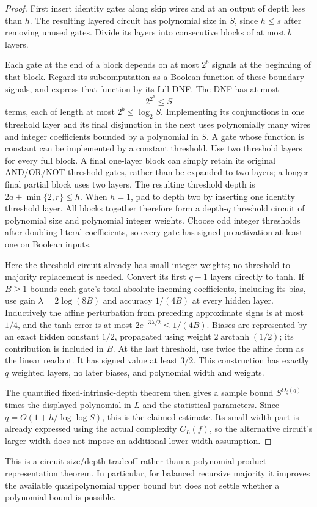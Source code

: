 \begin{proof}
First insert identity gates along skip wires and at an output of depth
less than $h$. The resulting layered circuit has polynomial size in $S$,
since $h\le s$ after removing unused gates. Divide its layers into
consecutive blocks of at most $b$ layers.

Each gate at the end of a block depends on at most $2^b$ signals at the
beginning of that block. Regard its subcomputation as a Boolean function
of these boundary signals, and express that function by its full DNF.
The DNF has at most
\[
 2^{2^b}\le S
\]
terms, each of length at most $2^b\le\log_2 S$. Implementing its
conjunctions in one threshold layer and its final disjunction in the
next uses polynomially many wires and integer coefficients bounded by
a polynomial in $S$. A gate whose function is constant can be
implemented by a constant threshold. Use two threshold layers for
every full block. A final one-layer block can simply retain its
original AND/OR/NOT threshold gates, rather than be expanded to two
layers; a longer final partial block uses two layers. The resulting
threshold depth is $2a+\min\{2,r\}\le h$. When $h=1$, pad to depth
two by inserting one identity threshold layer. All blocks together
therefore form a depth-$q$ threshold circuit of polynomial size and
polynomial integer weights. Choose odd integer thresholds after doubling literal
coefficients, so every gate has signed preactivation at least one on
Boolean inputs.

Here the threshold circuit already has small integer weights; no
threshold-to-majority replacement is needed. Convert its first $q-1$
layers directly to tanh. If $B\ge1$ bounds each gate's total absolute
incoming coefficients, including its bias, use gain
$\lambda=2\log(8B)$ and accuracy $1/(4B)$ at every hidden layer.
Inductively the affine perturbation from preceding approximate signs
is at most $1/4$, and the tanh error is at most
$2e^{-3\lambda/2}\le1/(4B)$. Biases are represented by an exact
hidden constant $1/2$, propagated using weight
$2\operatorname{arctanh}(1/2)$; its contribution is included in $B$.
At the last threshold, use twice the affine form as the linear readout.
It has signed value at least $3/2$. This construction has exactly $q$
weighted layers, no later biases, and polynomial width and weights.

The quantified fixed-intrinsic-depth theorem then gives a sample bound
$S^{O_\zeta(q)}$ times the displayed polynomial in $L$ and the
statistical parameters. Since $q=O(1+h/\log\log S)$, this is the
claimed estimate. Its small-width part is already expressed using the
actual complexity $C_L(f)$, so the alternative circuit's larger width
does not impose an additional lower-width assumption.
\end{proof}

This is a circuit-size/depth tradeoff rather than a polynomial-product
representation theorem. In particular, for balanced recursive majority
it improves the available quasipolynomial upper bound but does not
settle whether a polynomial bound is possible.
